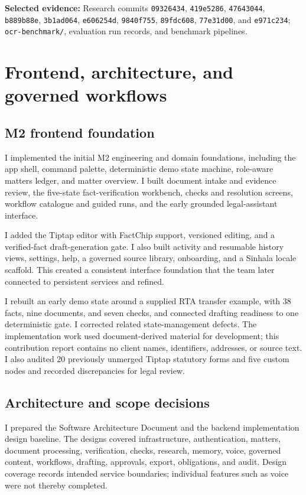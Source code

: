 \documentclass[11pt,a4paper]{article}
\newcommand{\evidence}[1]{\par{\small\textbf{Selected evidence:} #1}\par}
\newcommand{\repo}[1]{\texttt{\nolinkurl{#1}}}
\begin{document}
\evidence{Research commits \repo{09326434}, \repo{419e5286}, \repo{47643044}, \repo{b889b88e}, \repo{3b1ad064}, \repo{e606254d}, \repo{9840f755}, \repo{89fdc608}, \repo{77e31d00}, and \repo{e971c234}; \repo{ocr-benchmark/}, evaluation run records, and benchmark pipelines.}

\newpage
\section{Frontend, architecture, and governed workflows}
\subsection{M2 frontend foundation}
I implemented the initial M2 engineering and domain foundations, including the app shell, command palette, deterministic demo state machine, role-aware matters ledger, and matter overview. I built document intake and evidence review, the five-state fact-verification workbench, checks and resolution screens, workflow catalogue and guided runs, and the early grounded legal-assistant interface.

I added the Tiptap editor with FactChip support, versioned editing, and a verified-fact draft-generation gate. I also built activity and resumable history views, settings, help, a governed source library, onboarding, and a Sinhala locale scaffold. This created a consistent interface foundation that the team later connected to persistent services and refined.

I rebuilt an early demo state around a supplied RTA transfer example, with 38 facts, nine documents, and seven checks, and connected drafting readiness to one deterministic gate. I corrected related state-management defects. The implementation work used document-derived material for development; this contribution report contains no client names, identifiers, addresses, or source text. I also audited 20 previously unmerged Tiptap statutory forms and five custom nodes and recorded discrepancies for legal review.

\subsection{Architecture and scope decisions}
I prepared the Software Architecture Document and the backend implementation design baseline. The designs covered infrastructure, authentication, matters, document processing, verification, checks, research, memory, voice, governed content, workflows, drafting, approvals, export, obligations, and audit. Design coverage records intended service boundaries; individual features such as voice were not thereby completed.
\end{document}

